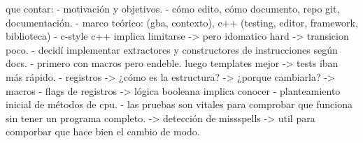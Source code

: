 que contar:
- motivación y objetivos.
- cómo edito, cómo documento, repo git, documentación.
- marco teórico: (gba, contexto), c++ (testing, editor, framework, biblioteca)
- c-style c++ implica limitarse -> pero idomatico hard -> transicion poco.
- decidí implementar extractores y constructores de instrucciones según docs.
- primero con macros pero endeble. luego templates mejor -> tests iban más rápido.
- registros -> ¿cómo es la estructura? -> ¿porque cambiarla? -> macros
- flags de registros -> lógica booleana implica conocer
- planteamiento inicial de métodos de cpu.
- las pruebas son vitales para comprobar que funciona sin tener un programa completo. -> detección de missspells -> util para comporbar que hace bien el cambio de modo.

